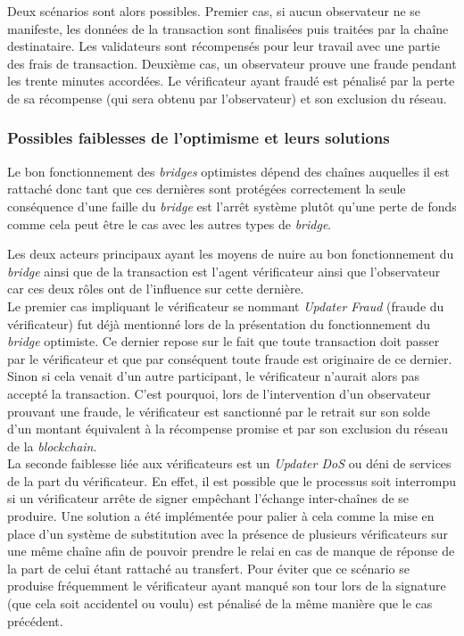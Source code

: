 Deux scénarios sont alors possibles. Premier cas, si aucun observateur ne se manifeste, les données de la transaction sont finalisées puis traitées par la chaîne destinataire. Les validateurs sont récompensés pour leur travail avec une partie des frais de transaction. \cite{Fees} Deuxième cas, un observateur prouve une fraude pendant les trente minutes accordées. Le \gls{vérificateur} ayant fraudé est pénalisé par la perte de sa récompense (qui sera obtenu par l'observateur) et son exclusion du réseau.\cite{EthereumSlashing}

\subsubsection{Possibles faiblesses de l’optimisme et leurs solutions}

Le bon fonctionnement des \textit{bridges} optimistes dépend des chaînes auquelles il est rattaché donc tant que ces dernières sont protégées correctement la seule conséquence d’une faille du \textit{bridge} est l’arrêt système plutôt qu’une perte de fonds comme cela peut être le cas avec les autres types de \textit{bridge}.

Les deux acteurs principaux ayant les moyens de nuire au bon fonctionnement du \textit{bridge} ainsi que de la transaction est l’agent \gls{vérificateur} ainsi que l’observateur car ces deux rôles ont de l’influence sur cette dernière. \\

Le premier cas impliquant le \gls{vérificateur} se nommant \textit{Updater Fraud} (fraude du \gls{vérificateur})  fut déjà mentionné lors de la présentation du fonctionnement du \textit{bridge} optimiste. Ce dernier repose sur le fait que toute transaction doit passer par le \gls{vérificateur} et que par conséquent toute fraude est originaire de ce dernier. Sinon si cela venait d’un autre participant, le \gls{vérificateur} n’aurait alors pas accepté la transaction. C’est pourquoi, lors de l’intervention d’un observateur prouvant une fraude, le \gls{vérificateur} est sanctionné par le retrait sur son solde d'un montant équivalent à la récompense promise et par son exclusion du réseau de la \textit{blockchain}. \\

La seconde faiblesse liée aux \gls{vérificateur}s est un \textit{Updater DoS} ou déni de services de la part du \gls{vérificateur}. En effet, il est possible que le processus soit interrompu si un vérificateur arrête de signer empêchant l'échange inter-chaînes de se produire.
Une solution a été implémentée pour palier à cela comme la mise en place d’un système de substitution avec la présence de plusieurs \gls{vérificateur}s sur une même chaîne afin de pouvoir prendre le relai en cas de manque de réponse de la part de celui étant rattaché au transfert.  Pour éviter que ce scénario se produise fréquemment le \gls{vérificateur} ayant manqué son tour lors de la signature (que cela soit accidentel ou voulu) est pénalisé de la même manière que le cas précédent. \\

